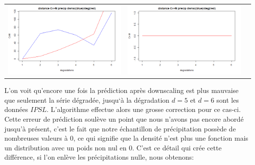 \documentclass[a4paper,10pt]{article}
\begin{document}
	\vspace{0.5cm}
	
	\hspace{-1cm}
	\begin{tabular}{ccc}
		\includegraphics[scale=0.4]{images/Dist_CVM_precip.png} & \includegraphics[scale=0.4]{images/Dist_CVM_evap.png}  \\
	\end{tabular} 
	
	
	L'on voit qu'encore une fois la prédiction après downscaling est plus mauvaise que seulement la série dégradée, jusqu`à la dégradation $d=5$ et $d=6$ sont les données $IPSL$. L'algorithme effectue alors une grosse correction pour ce cas-ci. Cette erreur de prédiction soulève un point que nous n'avons pas encore abordé jusqu'à présent, c'est le fait que notre échantillon de précipitation possède de nombreuses valeurs à $0$, ce qui signifie que la densité n'est plus une fonction mais un distribution avec un poids non nul en $0$. C'est ce détail qui crée cette différence, si l'on enlève les précipitations nulle, nous obtenons:
	
\end{document}
